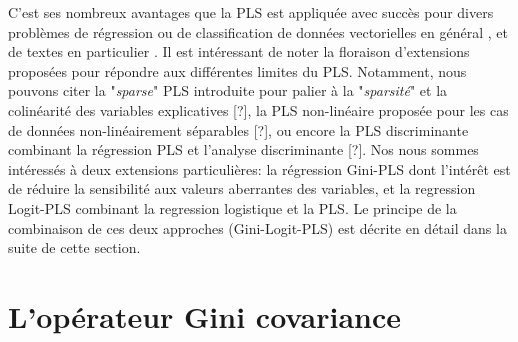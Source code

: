 C'est ses nombreux avantages que la PLS est appliquée avec succès pour divers problèmes de régression \citep{lacroux2011avantagesPLS}
 ou de  classification de données vectorielles en général \citep{liu2007pls4classif,durif2017sparsePLSandLogit, bazzoli2018classificationwithLS-PLS}, et de textes en particulier \citep{zeng2007textclassPLS}.
Il est intéressant de noter la floraison d'extensions proposées pour répondre aux différentes limites du PLS. Notamment, nous pouvons citer la "\textit{sparse}" PLS introduite pour palier à la "\textit{sparsité}" et la colinéarité des variables explicatives [?], la PLS non-linéaire proposée pour les cas de données non-linéairement séparables [?], ou encore la PLS discriminante combinant la régression PLS et l'analyse discriminante [?]. Nos nous sommes intéressés à deux extensions particulières: la régression Gini-PLS \citep{mussard2018ginipls} dont l'intérêt est de réduire la sensibilité aux valeurs aberrantes des variables, et la regression Logit-PLS \citep{tenenhaus2005logitpls}  combinant la regression logistique et la PLS. Le principe de la combinaison de ces deux approches (Gini-Logit-PLS) est décrite en détail dans la suite de cette section.


\section{L'opérateur Gini covariance}

